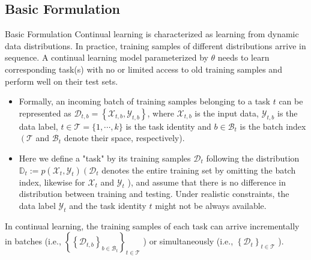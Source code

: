 \documentclass[9pt,dvipsnames]{beamer}
\begin{document}
\subsection{Basic Formulation}
\begin{frame}{Basic Formulation}
    Continual learning is characterized as learning from dynamic data distributions. In practice, training samples of different distributions arrive in sequence. A continual learning model parameterized by $\theta$ needs to learn corresponding task(s) with no or limited access to old training samples and perform well on their test sets.

    \begin{itemize}
        \item Formally, an incoming batch of training samples belonging to a task $t$ can be represented as $\mathcal{D}_{t, b}=\left\{\mathcal{X}_{t, b}, \mathcal{Y}_{t, b}\right\}$, where $\mathcal{X}_{t, b}$ is the input data, $\mathcal{Y}_{t, b}$ is the data label, $t \in \mathcal{T}=\{1, \cdots, k\}$ is the task identity and $b \in \mathcal{B}_{t}$ is the batch index $\left(\mathcal{T}\right.$ and $\mathcal{B}_{t}$ denote their space, respectively).
        \item Here we define a "task" by its training samples $\mathcal{D}_{t}$ following the distribution $\mathbb{D}_{t}:=p\left(\mathcal{X}_{t}, \mathcal{Y}_{t}\right)\left(\mathcal{D}_{t}\right.$ denotes the entire training set by omitting the batch index, likewise for $\mathcal{X}_{t}$ and $\mathcal{Y}_{t}$ ), and assume that there is no difference in distribution between training and testing. Under realistic constraints, the data label $\mathcal{Y}_{t}$ and the task identity $t$ might not be always available.
    \end{itemize}
    In continual learning, the training samples of each task can arrive incrementally in batches (i.e., $\left\{\left\{\mathcal{D}_{t, b}\right\}_{b \in \mathcal{B}_{t}}\right\}_{t \in \mathcal{T}}$ ) or simultaneously (i.e., $\left\{\mathcal{D}_{t}\right\}_{t \in \mathcal{T}}$ ).
\end{frame}
\end{document}
